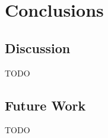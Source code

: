 \documentclass[logo,bsc,singlespacing,parskip,online]{infthesis}
\begin{document}






\chapter{Conclusions}
\section{Discussion}
% 
TODO
\section{Future Work}
TODO








\end{document}
